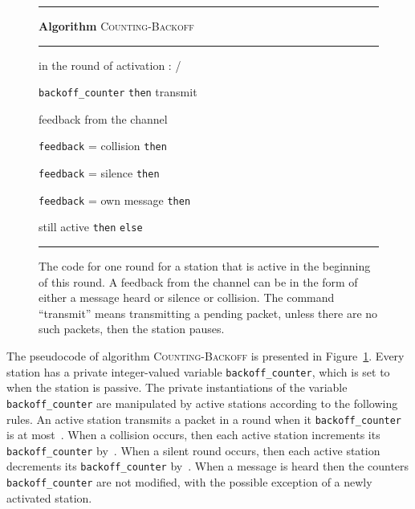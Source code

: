 \documentclass[11pt]{article}
\newcommand{\F}{\vspace*{\smallskipamount}}
\newcommand{\FFF}{\vspace*{\bigskipamount}}
\newcommand{\B}{\vspace*{-\smallskipamount}}
\newcommand{\Item}{\B\item}
\newlength{\pagewidth}
\newlength{\captionwidth}
\begin{document}
\begin{figure}[t]
\rule{\textwidth}{0.75pt}

\F 
\textbf{Algorithm} \textsc{Counting-Backoff} 

\rule{\textwidth}{0.75pt}
\begin{center}
\begin{minipage}{\pagewidth}
\begin{description}
\Item[\rm /] in the round of activation :  / 

\Item[\tt if] \texttt{backoff\_counter}   \texttt{then} transmit

\Item[\tt feedback]  feedback from the channel 

\Item[\tt if] \texttt{feedback} = collision  \texttt{then}
		
		
\Item[\tt else if] \texttt{feedback} = silence  \texttt{then} 

\Item[\tt else if] \texttt{feedback} = own message \texttt{then}
\begin{description}

\Item[\tt if] still active  \texttt{then}   \texttt{else} 

\end{description}
\end{description}
\end{minipage}
\FFF

\rule{\textwidth}{0.75pt}

\parbox{\captionwidth}{\caption{\label{alg:stack-backoff}
The code for one round for a station that is active in the beginning of this round. 
A feedback from the channel can be in the form of either a message heard or  silence or  collision.
The command ``transmit'' means transmitting a pending packet, unless there are no such packets, then the station pauses.
}}
\end{center}
\end{figure}

The pseudocode of algorithm \textsc{Counting-Backoff} is presented in Figure~\ref{alg:stack-backoff}. 
Every station has a private integer-valued variable \texttt{backoff\-\_counter}, which is set to~  when the station is passive. 
The private instantiations of the variable \texttt{backoff\_counter} are manipulated by active stations according to the following rules.
An active station transmits a packet  in a round when it \texttt{\texttt{backoff\_counter}} is at most~.
When a collision occurs, then each active station increments its \texttt{backoff\_counter} by~.
When a silent round occurs, then each active station decrements its \texttt{backoff\_counter} by~.
When a message is heard then the counters \texttt{backoff\_counter} are not modified, with the possible exception of a newly activated station.
\end{document}
